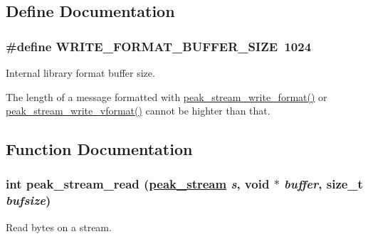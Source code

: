 \subsection{Define Documentation}
\hypertarget{group__stream__low_ga6}{
\subsubsection[WRITE\_\-FORMAT\_\-BUFFER\_\-SIZE]{\setlength{\rightskip}{0pt plus 5cm}\#define WRITE\_\-FORMAT\_\-BUFFER\_\-SIZE\ 1024}}
\label{group__stream__low_ga6}


Internal library format buffer size. 

The length of a message formatted with \hyperlink{group__stream__low_ga47}{peak\_\-stream\_\-write\_\-format()} or \hyperlink{group__stream__low_ga48}{peak\_\-stream\_\-write\_\-vformat()} cannot be highter than that. 

\subsection{Function Documentation}
\hypertarget{group__stream__low_ga0}{
\subsubsection[peak\_\-stream\_\-read]{\setlength{\rightskip}{0pt plus 5cm}int peak\_\-stream\_\-read (\hyperlink{group__stream_ga0}{peak\_\-stream} {\em s}, void $\ast$ {\em buffer}, size\_\-t {\em bufsize})}}
\label{group__stream__low_ga0}


Read bytes on a stream. 


